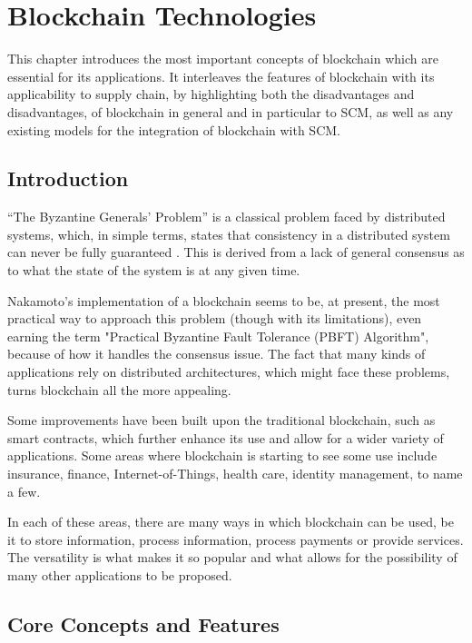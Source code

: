 \chapter{Blockchain Technologies}
\label{chap:blockchain}

\minitoc \mtcskip \noindent

This chapter introduces the most important concepts of blockchain which are essential for its applications. It interleaves the features of blockchain with its applicability to supply chain, by highlighting both the disadvantages and disadvantages, of blockchain in general and in particular to SCM, as well as any existing models for the integration of blockchain with SCM.

\section{Introduction}
“The Byzantine Generals' Problem” is a classical problem faced by distributed systems, which, in simple terms, states that consistency in a distributed system can never be fully guaranteed \cite{byzantine-generals-problem}. This is derived from a lack of general consensus as to what the state of the system is at any given time.

Nakamoto's implementation of a blockchain seems to be, at present, the most practical way to approach this problem (though with its limitations), even earning the term "Practical Byzantine Fault Tolerance (PBFT) Algorithm", because of how it handles the consensus issue. The fact that many kinds of applications rely on distributed architectures, which might face these problems, turns blockchain all the more appealing. 
   
Some improvements have been built upon the traditional blockchain, such as smart contracts, which further enhance its use and allow for a wider variety of applications. Some areas where blockchain is starting to see some use include insurance, finance, Internet-of-Things, health care, identity management, to name a few.

In each of these areas, there are many ways in which blockchain can be used, be it to store information, process information, process payments or provide services. The versatility is what makes it so popular and what allows for the possibility of many other applications to be proposed.

\section{Core Concepts and Features}

